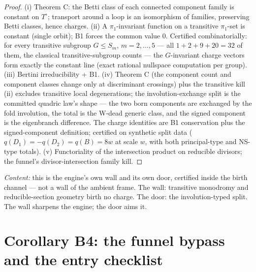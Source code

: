 \documentclass[11pt]{article}
\begin{document}
\begin{proof}
(i) Theorem C: the Betti class of each connected component family is
constant on $T^\circ$; transport around a loop is an isomorphism of families,
preserving Betti classes, hence charges. (ii) A $\pi_1$-invariant function on
a transitive $\pi_1$-set is constant (single orbit); B1 forces the common
value $0$. Certified combinatorially: for every transitive subgroup
$G \le S_m$, $m = 2,\dots,5$ --- all $1 + 2 + 9 + 20 = 32$ of them, the
classical transitive-subgroup counts --- the $G$-invariant charge vectors form
exactly the constant line (exact rational nullspace computation per group).
(iii) Bertini irreducibility + B1. (iv) Theorem C (the component count and
component classes change only at discriminant crossings) plus the transitive
kill (ii) excludes transitive local degenerations; the involution-exchange
split is the committed quadric law's shape --- the two born components are
exchanged by the fold involution, the total is the W-dead generic class, and
the signed component is the eigenbranch difference. The charge identities are
B1 conservation plus the signed-component definition; certified on synthetic
split data ($q(D_1) = -q(D_2) = q(B) = 8w$ at scale $w$, with both
principal-type and NS-type totals). (v) Functoriality of the intersection
product on reducible divisors; the funnel's divisor-intersection family kill.
\end{proof}

\emph{Content:} this is the engine's own wall and its own door, certified
inside the birth channel --- not a wall of the ambient frame. The wall:
transitive monodromy and reducible-section geometry birth no charge. The
door: the involution-typed split. The wall sharpens the engine; the door aims
it.

\section{Corollary B4: the funnel bypass and the entry checklist}
\end{document}
